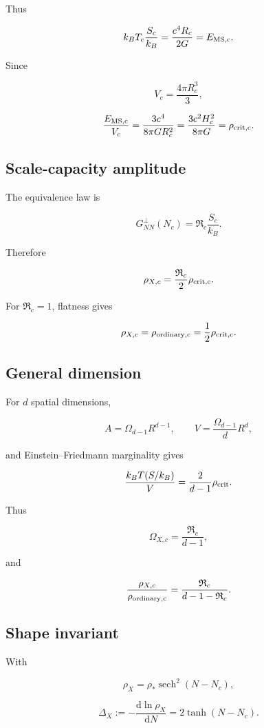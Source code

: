 \documentclass[
  11pt,
  letterpaper,
]{article}
\begin{document}
Thus

\[
k_BT_c\frac{S_c}{k_B}=\frac{c^4R_c}{2G}=E_{\rm MS,c}.
\]

Since

\[
V_c=\frac{4\pi R_c^3}{3},
\]

\[
\frac{E_{\rm MS,c}}{V_c}=\frac{3c^4}{8\pi GR_c^2}=\frac{3c^2H_c^2}{8\pi G}=\rho_{\rm crit,c}.
\]

\subsection{Scale-capacity amplitude}\label{scale-capacity-amplitude}

The equivalence law is

\[
G^{\perp}_{NN}(N_c)=\mathfrak R_c\frac{S_c}{k_B}.
\]

Therefore

\[
\rho_{X,c}=\frac{\mathfrak R_c}{2}\rho_{\rm crit,c}.
\]

For \(\mathfrak R_c=1\), flatness gives

\[
\rho_{X,c}=\rho_{\rm ordinary,c}=\frac12\rho_{\rm crit,c}.
\]

\subsection{General dimension}\label{general-dimension}

For \(d\) spatial dimensions,

\[
A=\Omega_{d-1}R^{d-1},
\qquad
V=\frac{\Omega_{d-1}}{d}R^d,
\]

and Einstein--Friedmann marginality gives

\[
\frac{k_BT(S/k_B)}{V}=\frac{2}{d-1}\rho_{\rm crit}.
\]

Thus

\[
\Omega_{X,c}=\frac{\mathfrak R_c}{d-1},
\]

and

\[
\frac{\rho_{X,c}}{\rho_{\rm ordinary,c}}=
\frac{\mathfrak R_c}{d-1-\mathfrak R_c}.
\]

\subsection{Shape invariant}\label{shape-invariant}

With

\[
\rho_X=\rho_*\operatorname{sech}^2(N-N_c),
\]

\[
\Delta_X:=-\frac{\mathrm d\ln\rho_X}{\mathrm dN}=2\tanh(N-N_c).
\]
\end{document}
